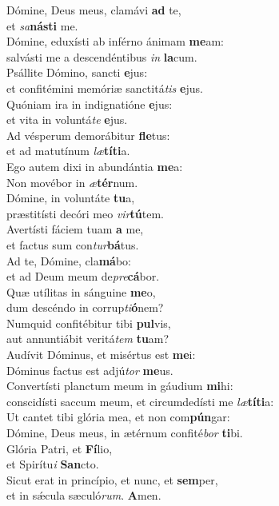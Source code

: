 \evenverse Dómine, Deus meus, clamávi \textbf{ad} te,~\*\\
\evenverse et \textit{sa}\textbf{ná}\textbf{sti} me.\\
\oddverse Dómine, eduxísti ab inférno ánimam \textbf{me}am:~\*\\
\oddverse salvásti me a descendéntibus \textit{in} \textbf{la}cum.\\
\evenverse Psállite Dómino, sancti \textbf{e}jus:~\*\\
\evenverse et confitémini memóriæ sanctitá\textit{tis} \textbf{e}jus.\\
\oddverse Quóniam ira in indignatióne \textbf{e}jus:~\*\\
\oddverse et vita in voluntá\textit{te} \textbf{e}jus.\\
\evenverse Ad vésperum demorábitur \textbf{fle}tus:~\*\\
\evenverse et ad matutínum \textit{læ}\textbf{tí}\textbf{ti}a.\\
\oddverse Ego autem dixi in abundántia \textbf{me}a:~\*\\
\oddverse Non movébor in \textit{æ}\textbf{tér}num.\\
\evenverse Dómine, in voluntáte \textbf{tu}a,~\*\\
\evenverse præstitísti decóri meo \textit{vir}\textbf{tú}tem.\\
\oddverse Avertísti fáciem tuam \textbf{a} me,~\*\\
\oddverse et factus sum con\textit{tur}\textbf{bá}tus.\\
\evenverse Ad te, Dómine, cla\textbf{má}bo:~\*\\
\evenverse et ad Deum meum de\textit{pre}\textbf{cá}bor.\\
\oddverse Quæ utílitas in sánguine \textbf{me}o,~\*\\
\oddverse dum descéndo in corrup\textit{ti}\textbf{ó}nem?\\
\evenverse Numquid confitébitur tibi \textbf{pul}vis,~\*\\
\evenverse aut annuntiábit veritá\textit{tem} \textbf{tu}am?\\
\oddverse Audívit Dóminus, et misértus est \textbf{me}i:~\*\\
\oddverse Dóminus factus est adjú\textit{tor} \textbf{me}us.\\
\evenverse Convertísti planctum meum in gáudium \textbf{mi}hi:~\*\\
\evenverse conscidísti saccum meum, et circumdedísti me \textit{læ}\textbf{tí}\textbf{ti}a:\\
\oddverse Ut cantet tibi glória mea, et non com\textbf{pún}gar:~\*\\
\oddverse Dómine, Deus meus, in ætérnum confité\textit{bor} \textbf{ti}bi.\\
\evenverse Glória Patri, et \textbf{Fí}lio,~\*\\
\evenverse et Spirítu\textit{i} \textbf{San}cto.\\
\oddverse Sicut erat in princípio, et nunc, et \textbf{sem}per,~\*\\
\oddverse et in sǽcula sæculó\textit{rum}. \textbf{A}men.\\
